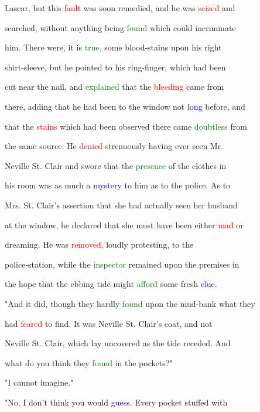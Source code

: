  Lascar, but this \textcolor{red}{fault} was soon remedied, and he was \textcolor{red}{seized} and

 searched, without anything being \textcolor{green}{found} which could incriminate

 him. There were, it is \textcolor{green}{true,} some blood-stains upon his right

 shirt-sleeve, but he pointed to his ring-finger, which had been

 cut near the nail, and \textcolor{green}{explained} that the \textcolor{red}{bleeding} came from

 there, adding that he had been to the window not \textcolor{blue}{long} before, and

 that the \textcolor{red}{stains} which had been observed there came \textcolor{green}{doubtless} from

 the same source. He \textcolor{red}{denied} strenuously having ever seen Mr.

 Neville St. Clair and swore that the \textcolor{green}{presence} of the clothes in

 his room was as much a \textcolor{blue}{mystery} to him as to the \textcolor{BurntOrange}{police.} As to

 Mrs. St. Clair's assertion that she had actually seen her husband

 at the window, he declared that she must have been either \textcolor{red}{mad} or

 dreaming. He was \textcolor{red}{removed,} loudly protesting, to the

 police-station, while the \textcolor{green}{inspector} remained upon the premises in

 the \textcolor{BurntOrange}{hope} that the ebbing tide might \textcolor{green}{afford} some fresh \textcolor{blue}{clue.}



 "And it did, though they hardly \textcolor{green}{found} upon the mud-bank what they

 had \textcolor{red}{feared} to find. It was Neville St. Clair's coat, and not

 Neville St. Clair, which lay uncovered as the tide receded. And

 what do you think they \textcolor{green}{found} in the pockets?"



 "I cannot imagine."



 "No, I don't think you would \textcolor{blue}{guess.} Every pocket stuffed with

